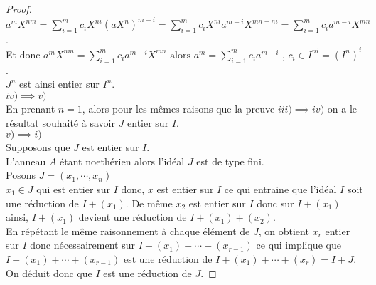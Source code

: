 \begin{proof}
	$a^m X^{nm} = \displaystyle \sum_{i=1}^{m}{c_i X^{ni} (aX^n)^{m-i}} = \displaystyle \sum_{i=1}^{m}{c_i X^{ni} a^{m-i} X^{mn-ni}} = \displaystyle \sum_{i=1}^{m}{c_i a^{m-i} X^{mn}}$.\\
	Et donc $a^m X^{nm} = \displaystyle \sum_{i=1}^{m}{c_i a^{m-i} X^{mn}} \text{ alors } a^m = \displaystyle \sum_{i=1}^{m}{c_i a^{m-i}}$ , $c_i \in I^{ni} = (I^n)^i$.\\
	$J^n$ est ainsi entier sur $I^n$.\\
	$iv) \implies v)$\\
	En prenant $n = 1$, alors pour les mêmes raisons que la preuve $iii) \implies iv)$ on a le résultat souhaité à savoir $J$ entier sur $I$.\\
	$v) \implies i)$\\
	Supposons que $J$ est entier sur $I$.\\
	L'anneau $A$ étant noethérien alors l'idéal $J$ est de type fini.\\ Posons $J = (x_1, \cdots ,x_n)$\\
	$x_1 \in J$ qui est entier sur $I$ donc, $x$ est entier sur $I$ ce qui entraine que l'idéal $I$ soit une réduction de $I + (x_1)$. De même $x_2$ est entier sur $I$ donc sur $I + (x_1)$ ainsi, $I + (x_1)$ devient une réduction de $I + (x_1) + (x_2)$.\\ En répétant le même raisonnement à chaque élément de $J$, on obtient $x_r$ entier sur $I$ donc nécessairement sur $I + (x_1) + \cdots +(x_{r-1})$ ce qui implique que $I + (x_1) + \cdots +(x_{r-1})$ est une réduction de $I + (x_1) + \cdots +(x_{r}) = I+J$.\\
	On déduit donc que $I$ est une réduction de $J$. 
\end{proof}

